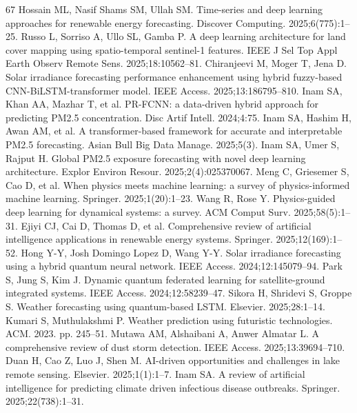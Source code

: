 \documentclass[pdflatex,sn-mathphys,Numbered]{sn-jnl}%
\begin{document}
\begin{thebibliography}{67}
 Hossain ML, Nasif Shams SM, Ullah SM. Time-series and deep learning approaches for renewable energy forecasting. Discover Computing. 2025;6(775):1--25.
 Russo L, Sorriso A, Ullo SL, Gamba P. A deep learning architecture for land cover mapping using spatio-temporal sentinel-1 features. IEEE J Sel Top Appl Earth Observ Remote Sens. 2025;18:10562--81.
 Chiranjeevi M, Moger T, Jena D. Solar irradiance forecasting performance enhancement using hybrid fuzzy-based CNN-BiLSTM-transformer model. IEEE Access. 2025;13:186795--810.
 Inam SA, Khan AA, Mazhar T, et al. PR-FCNN: a data-driven hybrid approach for predicting PM2.5 concentration. Disc Artif Intell. 2024;4:75.
 Inam SA, Hashim H, Awan AM, et al. A transformer-based framework for accurate and interpretable PM2.5 forecasting. Asian Bull Big Data Manage. 2025;5(3).
 Inam SA, Umer S, Rajput H. Global PM2.5 exposure forecasting with novel deep learning architecture. Explor Environ Resour. 2025;2(4):025370067.
 Meng C, Griesemer S, Cao D, et al. When physics meets machine learning: a survey of physics-informed machine learning. Springer. 2025;1(20):1--23.
 Wang R, Rose Y. Physics-guided deep learning for dynamical systems: a survey. ACM Comput Surv. 2025;58(5):1--31.
 Ejiyi CJ, Cai D, Thomas D, et al. Comprehensive review of artificial intelligence applications in renewable energy systems. Springer. 2025;12(169):1--52.
 Hong Y-Y, Josh Domingo Lopez D, Wang Y-Y. Solar irradiance forecasting using a hybrid quantum neural network. IEEE Access. 2024;12:145079--94.
 Park S, Jung S, Kim J. Dynamic quantum federated learning for satellite-ground integrated systems. IEEE Access. 2024;12:58239--47.
 Sikora H, Shridevi S, Groppe S. Weather forecasting using quantum-based LSTM. Elsevier. 2025;28:1--14.
 Kumari S, Muthulakshmi P. Weather prediction using futuristic technologies. ACM. 2023. pp. 245--51.
 Mutawa AM, Alshaibani A, Anwer Almatar L. A comprehensive review of dust storm detection. IEEE Access. 2025;13:39694--710.
 Duan H, Cao Z, Luo J, Shen M. AI-driven opportunities and challenges in lake remote sensing. Elsevier. 2025;1(1):1--7.
 Inam SA. A review of artificial intelligence for predicting climate driven infectious disease outbreaks. Springer. 2025;22(738):1--31.

\end{thebibliography}
\end{document}
